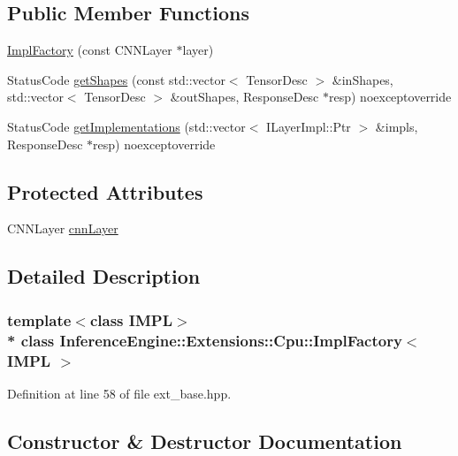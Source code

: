 \subsection*{Public Member Functions}
\begin{DoxyCompactItemize}
\item 
\hyperlink{classInferenceEngine_1_1Extensions_1_1Cpu_1_1ImplFactory_a86837f88ce5c196382c1f7c38e3ba3a8}{Impl\+Factory} (const C\+N\+N\+Layer $\ast$layer)
\item 
Status\+Code \hyperlink{classInferenceEngine_1_1Extensions_1_1Cpu_1_1ImplFactory_a93f5773c82ff0e8ec49496e86cdc1a68}{get\+Shapes} (const std\+::vector$<$ Tensor\+Desc $>$ \&in\+Shapes, std\+::vector$<$ Tensor\+Desc $>$ \&out\+Shapes, Response\+Desc $\ast$resp) noexceptoverride
\item 
Status\+Code \hyperlink{classInferenceEngine_1_1Extensions_1_1Cpu_1_1ImplFactory_a74b379a1a7dfae6fcc2c2b0146361802}{get\+Implementations} (std\+::vector$<$ I\+Layer\+Impl\+::\+Ptr $>$ \&impls, Response\+Desc $\ast$resp) noexceptoverride
\end{DoxyCompactItemize}
\subsection*{Protected Attributes}
\begin{DoxyCompactItemize}
\item 
C\+N\+N\+Layer \hyperlink{classInferenceEngine_1_1Extensions_1_1Cpu_1_1ImplFactory_a03cc9ae94115704d93b27a9a62b0619a}{cnn\+Layer}
\end{DoxyCompactItemize}


\subsection{Detailed Description}
\subsubsection*{template$<$class I\+M\+PL$>$\\*
class Inference\+Engine\+::\+Extensions\+::\+Cpu\+::\+Impl\+Factory$<$ I\+M\+P\+L $>$}



Definition at line 58 of file ext\+\_\+base.\+hpp.



\subsection{Constructor \& Destructor Documentation}
